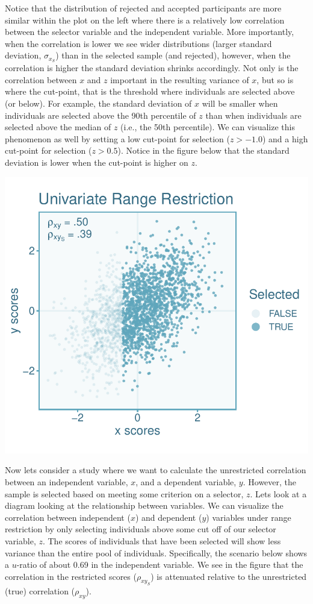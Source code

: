 \documentclass[
  letterpaper,
  DIV=11,
  numbers=noendperiod]{scrreprt}
\begin{document}
Notice that the distribution of rejected and accepted participants are
more similar within the plot on the left where there is a relatively low
correlation between the selector variable and the independent variable.
More importantly, when the correlation is lower we see wider
distributions (larger standard deviation, \(\sigma_{x_S}\)) than in the
selected sample (and rejected), however, when the correlation is higher
the standard deviation shrinks accordingly. Not only is the correlation
between \(x\) and \(z\) important in the resulting variance of \(x\),
but so is where the cut-point, that is the threshold where individuals
are selected above (or below). For example, the standard deviation of
\(x\) will be smaller when individuals are selected above the 90th
percentile of \(z\) than when individuals are selected above the median
of \(z\) (i.e., the 50th percentile). We can visualize this phenomenon
as well by setting a low cut-point for selection (\(z>-1.0\)) and a high
cut-point for selection (\(z>0.5\)). Notice in the figure below that the
standard deviation is lower when the cut-point is higher on \(z\).

\includegraphics{indirect_range_restriction_files/figure-pdf/unnamed-chunk-2-1.pdf}

Now lets consider a study where we want to calculate the unrestricted
correlation between an independent variable, \(x\), and a dependent
variable, \(y\). However, the sample is selected based on meeting some
criterion on a selector, \(z\). Lets look at a diagram looking at the
relationship between variables. We can visualize the correlation between
independent (\(x\)) and dependent (\(y\)) variables under range
restriction by only selecting individuals above some cut off of our
selector variable, \(z\). The scores of individuals that have been
selected will show less variance than the entire pool of individuals.
Specifically, the scenario below shows a \(u\)-ratio of about 0.69 in
the independent variable. We see in the figure that the correlation in
the restricted scores (\(\rho_{xy_S}\)) is attenuated relative to the
unrestricted (true) correlation (\(\rho_{xy}\)).
\end{document}
